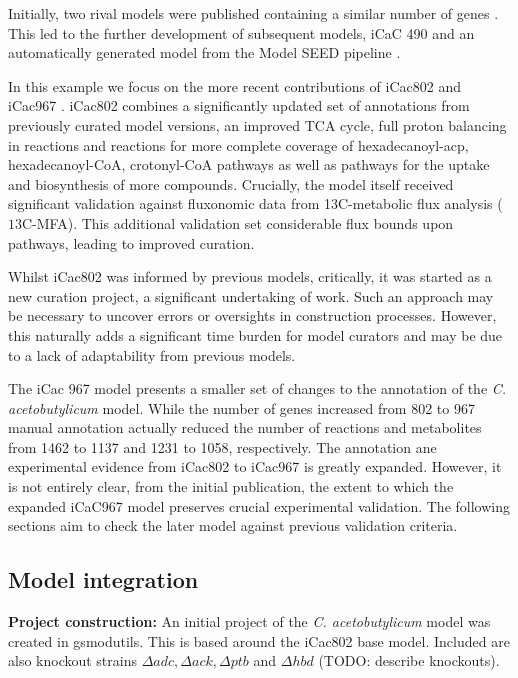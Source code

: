 \documentclass[a4paper,10pt]{article}
\begin{document}
Initially, two rival models were published containing a similar number of genes \cite{lee2008genome, senger2008genome}.
This led to the further development of subsequent models, iCaC 490 \cite{mcanulty2012genome} and an automatically generated model from  the Model SEED  pipeline \cite{}.

In this example we focus on the more recent contributions of iCac802 \cite{dash2014capturing} and iCac967 \cite{yoo2015quantitative}.
iCac802 combines a significantly updated set of annotations from previously curated model versions, an improved TCA cycle, full proton balancing in reactions and reactions for more complete coverage of hexadecanoyl-acp, hexadecanoyl-CoA, crotonyl-CoA pathways as well as pathways for the uptake and biosynthesis of more compounds.
Crucially, the model itself received significant validation against fluxonomic data from 13C-metabolic flux analysis ($13$C-MFA).
This additional validation set considerable flux bounds upon pathways, leading to improved curation.

Whilst iCac802 was informed by previous models, critically, it was started as a new curation project, a significant undertaking of work.
Such an approach may be necessary to uncover errors or oversights in construction processes.
However, this naturally adds a significant time burden for model curators and may be due to a lack of adaptability from previous models.

The iCac 967 model presents a smaller set of changes to the annotation of the \textit{C. acetobutylicum} model.
While the number of genes increased from 802 to 967 manual annotation actually reduced the number of reactions and metabolites from 1462 to 1137 and 1231 to 1058, respectively.
The annotation ane experimental evidence from iCac802 \cite{dash2014capturing} to iCac967 \cite{yoo2015quantitative} is greatly expanded.
However, it is not entirely clear, from the initial publication, the extent to which the expanded iCaC967 model preserves crucial experimental validation.
The following sections aim to check the later model against previous validation criteria.

\subsection{Model integration}
\textbf{Project construction:}
An initial project of the \textit{C. acetobutylicum} model was created in gsmodutils.
This is based around the iCac802 base model.
Included are also knockout strains $\Delta adc, \Delta ack, \Delta ptb$ and $\Delta hbd$ (TODO: describe knockouts).
\end{document}
